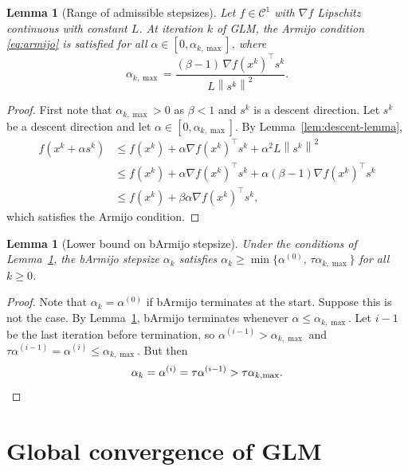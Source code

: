 \documentclass[11pt,a4paper]{report}
\theoremstyle{plain}
\newtheorem{lemma}[theorem]{Lemma}
\theoremstyle{definition}
\newcommand{\norm}[1]{\left\lVert#1\right\rVert}
\newcommand{\grad}{\nabla}
\newcommand{\trans}{^{\top}}
\begin{document}
\begin{lemma}[Range of admissible stepsizes]\label{lem:armijo-range}
Let $f\in\mathcal{C}^{1}$ with $\grad f$ Lipschitz continuous with constant $L$.
At iteration $k$ of GLM, the Armijo condition \eqref{eq:armijo} is satisfied
for all $\alpha\in[0,\alpha_{k,\max}]$, where
\[
\alpha_{k,\max}=\frac{(\beta-1)\,\grad f(x^{k})\trans s^{k}}{L\norm{s^{k}}^{2}}.
\]
\end{lemma}
\begin{proof}
  First note that $\alpha_{k,\max} > 0$ as $\beta < 1$ and $s^{k}$ is a descent direction. Let $s^{k}$ be a descent direction and let $\alpha \in [0, \alpha_{k,\max}]$. By Lemma~\ref{lem:descent-lemma}, 
  \begin{align*}
    f(x^{k} + \alpha s^{k}) 
    &\leq f(x^{k}) + \alpha \grad f(x^{k})\trans s^{k} + \alpha^2 L\norm{s^{k}}^2 \\
    &\leq f(x^{k}) + \alpha \grad f(x^{k})\trans s^{k} + \alpha(\beta - 1)\grad f(x^{k})\trans s^{k}  \\
    &\leq f(x^{k}) + \beta\alpha\grad f(x^{k})\trans s^{k},
  \end{align*}
  which satisfies the Armijo condition.
\end{proof}

\begin{lemma}[Lower bound on bArmijo stepsize]\label{lem:bArmijo-step}
Under the conditions of Lemma~\ref{lem:armijo-range}, the bArmijo stepsize
$\alpha_{k}$ satisfies $\alpha_{k}\ge\min\{\alpha^{(0)},\,\tau\alpha_{k,\max}\}$
for all $k\ge 0$.
\end{lemma}
\begin{proof}
  Note that $\alpha_{k} = \alpha^{(0)}$ if bArmijo terminates at the start. Suppose this is not the case. By Lemma~\ref{lem:armijo-range}, bArmijo terminates whenever $\alpha \leq \alpha_{k,\max}$. Let $i - 1$ be the last iteration before termination, so $\alpha^{(i - 1)} > \alpha_{k,\max}$ and $\tau\alpha^{(i - 1)} = \alpha^{(i)} \leq \alpha_{k,\max}$. But then
  \[
    \alpha_{k} = \alpha^{(i)} = \tau\alpha^{(i - 1)} > \tau\alpha_{k,\max}. \qedhere
  \]
\end{proof}

\section{Global convergence of GLM}
\end{document}
